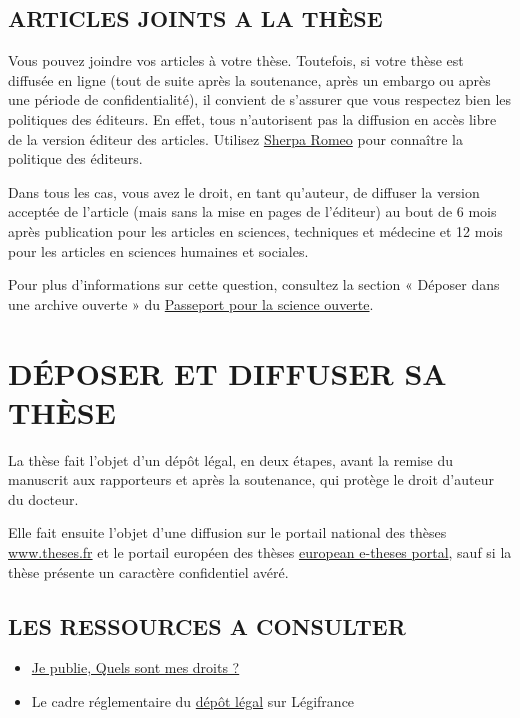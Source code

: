 \documentclass[french,12pt,a4paper]{book}
\begin{document}
\section{ARTICLES JOINTS A LA THÈSE}
Vous pouvez joindre vos articles à votre thèse. Toutefois, si votre thèse est diffusée en ligne (tout de suite après la soutenance, après un embargo ou après une période de confidentialité), il convient de s’assurer que vous respectez bien les politiques des éditeurs. En effet, tous n’autorisent pas la diffusion en accès libre de la version éditeur des articles. Utilisez \href{https://v2.sherpa.ac.uk/romeo/}{Sherpa Romeo} pour connaître la politique des éditeurs. \\ \par
Dans tous les cas, vous avez le droit, en tant qu’auteur, de diffuser la version acceptée de l’article (mais sans la mise en pages de l’éditeur) au bout de 6 mois après publication pour les articles en sciences, techniques et médecine et 12 mois pour les articles en sciences humaines et sociales. \\ \par
Pour plus d’informations sur cette question, consultez la section « Déposer dans une archive ouverte » du \href{https://www.ouvrirlascience.fr/wp-content/uploads/2021/09/Passeport-pour-la-science-ouverte-Guide-a-lusage-des-doctorants_10-09-2021_WEB_FR.pdf}{Passeport pour la science ouverte}.

\chapter{DÉPOSER ET DIFFUSER SA THÈSE}
La thèse fait l’objet d’un dépôt légal, en deux étapes, avant la remise du manuscrit aux rapporteurs et après la soutenance, qui protège le droit d’auteur du docteur.\\ \par 
Elle fait ensuite l’objet d’une diffusion sur le portail national des thèses \url{www.theses.fr} et le portail européen des thèses \href{https://www.dart-europe.org/basic-search.php}{european e-theses portal}, sauf si la thèse présente un caractère confidentiel avéré.
\section{LES RESSOURCES A CONSULTER}

\begin{itemize}
	\renewcommand{\labelitemi}{$\bullet$}
	\item \href{http://corist-shs.cnrs.fr/sites/default/files/ressources/droit_auteur_lecture_vf.pdf}{Je publie, Quels sont mes droits ?}
	\item Le cadre réglementaire du \href{https://www.legifrance.gouv.fr/codes/article_lc/LEGIARTI000006845515/}{dépôt légal} sur Légifrance
\end{itemize}
\end{document}
